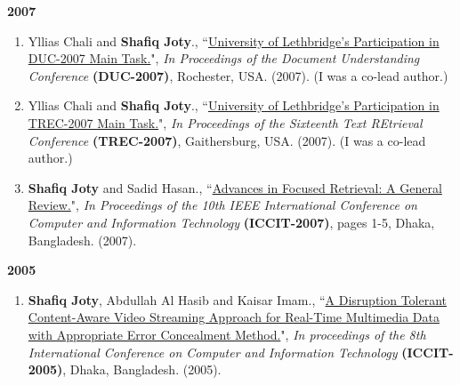 \documentclass[paper=letter,fontsize=11pt]{scrartcl} %
\newcommand{\NewPart}[2]{\section*{\uppercase{#1} #2}}
\newcommand{\PaperEntry}[7]{
		\noindent #1, ``\href{#7}{#2}", \textit{#3} \textbf{#4}, #5 (#6).}
\begin{document}
\Large \textbf{2007} \normalsize
\begin{enumerate}

\item \PaperEntry{Yllias Chali and \textbf{Shafiq Joty}.}{University of Lethbridge’s Participation in DUC-2007 Main Task.}{In Proceedings of the Document Understanding Conference} {(DUC-2007)}{Rochester, USA.}{2007}
{http://duc.nist.gov/pubs/2007papers/ulethbridge.pdf}
(I was a co-lead author.)

\item \PaperEntry{Yllias Chali and \textbf{Shafiq Joty}.}{University of Lethbridge’s Participation in TREC-2007 Main Task.}{In Proceedings of the Sixteenth Text REtrieval Conference} {(TREC-2007)}{Gaithersburg, USA.}{2007}
{http://trec.nist.gov/pubs/trec16/papers/ulethbridge.qa.final.pdf}
(I was a co-lead author.)

\item \PaperEntry{\textbf{Shafiq Joty} and Sadid Hasan.}{Advances in Focused Retrieval: A General Review.} {In Proceedings of the 10th IEEE International Conference on Computer and Information Technology}{(ICCIT-2007)}{pages 1-5, Dhaka, Bangladesh.}{2007}
{http://ieeexplore.ieee.org/xpls/abs_all.jsp?arnumber=4579357&tag=1}

\end{enumerate}

\Large \textbf{2005} \normalsize
\begin{enumerate}

\item \PaperEntry{\textbf{Shafiq Joty}, Abdullah Al Hasib and Kaisar Imam.} {A Disruption Tolerant Content-Aware Video Streaming Approach for Real-Time Multimedia Data with Appropriate Error Concealment Method.}{In proceedings of the 8th International Conference on Computer and Information Technology}{(ICCIT-2005)}{Dhaka, Bangladesh.}{2005}
{http://ieeexplore.ieee.org/xpls/abs_all.jsp?arnumber=4579357&tag=1}

\end{enumerate}



\end{document}
